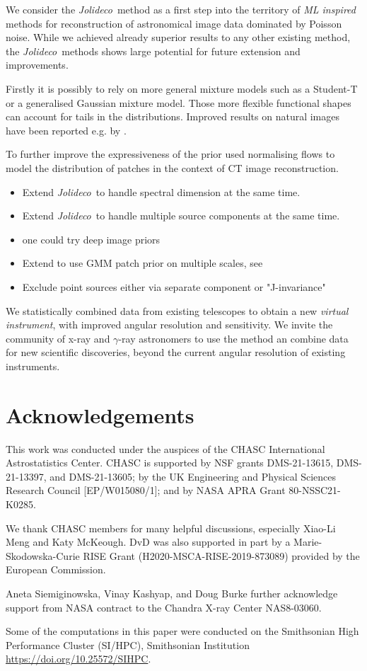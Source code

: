 \documentclass[twocolumn]{aastex631}
\newcommand{\jolideco}{\textit{Jolideco}~}
\newcommand{\gammaray}{$\gamma$-ray\xspace}
\begin{document}
    We consider the \jolideco method as a first step into the territory of \textit{ML inspired} methods for reconstruction of astronomical image data dominated by Poisson noise. While we achieved already superior results to any other existing method, the \jolideco methods shows large potential for future extension and improvements. 
    
    Firstly it is possibly to rely on more general mixture models such as a Student-T or a generalised Gaussian mixture model. Those more flexible functional shapes can account for tails in the distributions. Improved results on natural images have been reported e.g. by \cite{}.

    To further improve the expressiveness of the prior \cite{Altekrueger2022} used normalising flows to model the distribution of patches in the context of CT image reconstruction.
    
    \begin{itemize}
        \item Extend \jolideco to handle spectral dimension at the same time.
        \item Extend \jolideco to handle multiple source components at the same time.
        \item one could try deep image priors \citep{Ulyanov2017}
        \item Extend to use GMM patch prior on multiple scales, see \cite{Papyan2015}
        \item Exclude point sources either via separate component or "J-invariance"
    \end{itemize}

  

    We statistically combined data from existing telescopes to obtain a new \textit{virtual instrument}, with improved angular resolution and sensitivity. We invite the community of x-ray and \gammaray astronomers to use the method an combine data for new scientific discoveries, beyond the current angular resolution of existing instruments.

    \section*{Acknowledgements}
    This work was conducted under the auspices of the CHASC International Astrostatistics Center.
    CHASC is supported by NSF grants DMS-21-13615, DMS-21-13397, and DMS-21-13605; by the UK Engineering
    and Physical Sciences Research Council [EP/W015080/1]; and by NASA APRA Grant 80-NSSC21-K0285.
    
    We thank CHASC members for many helpful discussions, especially Xiao-Li Meng and Katy McKeough.
    DvD was also supported in part by a Marie-Skodowska-Curie RISE Grant (H2020-MSCA-RISE-2019-873089)
    provided by the European Commission.
    
    Aneta Siemiginowska, Vinay Kashyap, and Doug Burke further acknowledge support from NASA
    contract to the Chandra X-ray Center NAS8-03060.

    Some of the computations in this paper were conducted on the Smithsonian High Performance
    Cluster (SI/HPC), Smithsonian Institution \url{https://doi.org/10.25572/SIHPC}.

    \newpage
    
\end{document}
